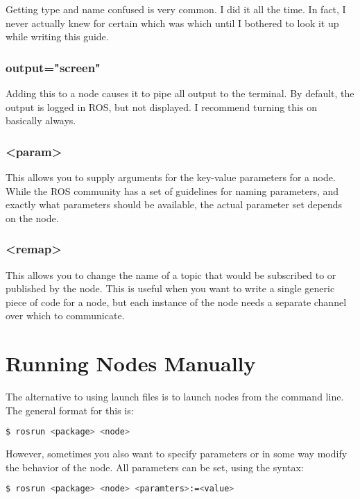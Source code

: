 Getting type and name confused is very common. I did it all the time. In fact, I never actually knew for certain which was which until I bothered to look it up while writing this guide.
 
\subsubsection{output="screen"}
 
Adding this to a node causes it to pipe all output to the terminal. By default, the output is logged in ROS, but not displayed. I recommend turning this on basically always.
 
\subsubsection{<param>}
 
This allows you to supply arguments for the key-value parameters for a node. While the ROS community has a set of guidelines for naming parameters, and exactly what parameters should be available, the actual parameter set depends on the node.

\subsubsection{<remap>}

This allows you to change the name of a topic that would be subscribed to or published by the node. This is useful when you want to write a single generic piece of code for a node, but each instance of the node needs a separate channel over which to communicate.

\section{Running Nodes Manually}

The alternative to using launch files is to launch nodes from the command line. The general format for this is:

\begin{lstlisting}[language=bash]
  $ rosrun <package> <node>
\end{lstlisting}
 
 However, sometimes you also want to specify parameters or in some way modify the behavior of the node. All parameters can be set, using the syntax:
 
 \begin{lstlisting}[language=bash]
  $ rosrun <package> <node> <paramters>:=<value>
\end{lstlisting}

